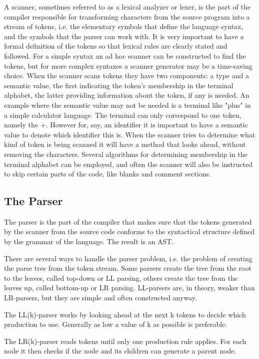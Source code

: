 A scanner, sometimes referred to as a lexical analyzer or lexer, is the part of the compiler responsible for transforming characters from the source program into a stream of tokens, i.e. the elementary symbols that define the language syntax, and the symbols that the parser can work with.
It is very important to have a formal definition of the tokens so that lexical rules are clearly stated and followed.
For a simple syntax an ad hoc scanner can be constructed to find the tokens, but for more complex syntaxes a scanner generator may be a time-saving choice.
When the scanner scans tokens they have two components: a type and a semantic value, the first indicating the token's membership in the terminal alphabet, the latter providing information about the token, if any is needed.
An example where the semantic value may not be needed is a terminal like "plus" in a simple calculator language. The terminal can only correspond to one token, namely the +. However for, say, an identifier it is important to have a semantic value to denote which identifier this is.
When the scanner tries to determine what kind of token is being scanned it will have a method that looks ahead, without removing the characters. Several algorithms for determining membership in the terminal alphabet can be employed, and often the scanner will also be instructed to skip certain parts of the code, like blanks and comment sections.

\subsection{The Parser}

The parser is the part of the compiler that makes sure that the tokens generated by the scanner from the source code conforms to the syntactical structure defined by the grammar of the language. The result is an AST. 

There are several ways to handle the parser problem, i.e. the problem of creating the parse tree from the token stream. Some parsers create the tree from the root to the leaves, called top-down or LL parsing, others create the tree from the leaves up, called bottom-up or LR parsing. LL-parsers are, in theory, weaker than LR-parsers, but they are simple and often constructed anyway.

The LL(k)-parser works by looking ahead at the next k tokens to decide which production to use. Generally as low a value of k as possible is preferable. 

The LR(k)-parser reads tokens until only one production rule applies. For each node it then checks if the node and its children can generate a parent node.

